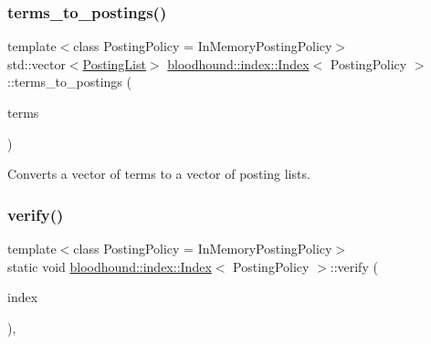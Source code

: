 \subsubsection{\texorpdfstring{terms\+\_\+to\+\_\+postings()}{terms\_to\_postings()}}
{\footnotesize\ttfamily template$<$class Posting\+Policy = In\+Memory\+Posting\+Policy$>$ \\
std\+::vector$<$\mbox{\hyperlink{classbloodhound_1_1PostingList}{Posting\+List}}$>$ \mbox{\hyperlink{classbloodhound_1_1index_1_1Index}{bloodhound\+::index\+::\+Index}}$<$ Posting\+Policy $>$\+::terms\+\_\+to\+\_\+postings (\begin{DoxyParamCaption}\item[{const std\+::vector$<$ \mbox{\hyperlink{structbloodhound_1_1TermId}{Term\+Id}} $>$}]{terms }\end{DoxyParamCaption})\hspace{0.3cm}{\ttfamily [inline]}}



Converts a vector of terms to a vector of posting lists. 

\mbox{\label{classbloodhound_1_1index_1_1Index_a6f1e18905c2b5babd30f33467c79018a}} 
\subsubsection{\texorpdfstring{verify()}{verify()}}
{\footnotesize\ttfamily template$<$class Posting\+Policy = In\+Memory\+Posting\+Policy$>$ \\
static void \mbox{\hyperlink{classbloodhound_1_1index_1_1Index}{bloodhound\+::index\+::\+Index}}$<$ Posting\+Policy $>$\+::verify (\begin{DoxyParamCaption}\item[{\mbox{\hyperlink{classbloodhound_1_1index_1_1Index}{Index}}$<$ Posting\+Policy $>$ \&}]{index }\end{DoxyParamCaption})\hspace{0.3cm}{\ttfamily [inline]}, {\ttfamily [static]}}

\mbox{\label{classbloodhound_1_1index_1_1Index_a02e947bdd77e51dcb09db5b7f03f14c7}} 

